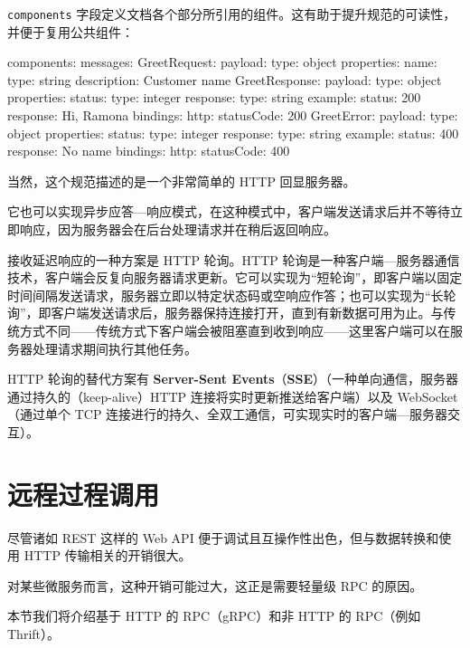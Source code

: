 \label{idx:1679}
\label{idx:1680}
\texttt{components} 字段定义文档各个部分所引用的组件。这有助于提升规范的可读性，并便于复用公共组件：

\begin{codebox}[yaml]
components:
  messages:
    GreetRequest:
      payload:
        type: object
        properties:
          name:
            type: string
            description: Customer name
    GreetResponse:
      payload:
        type: object
        properties:
          status:
            type: integer
          response:
            type: string
        example:
          status: 200
          response: Hi, Ramona
      bindings:
        http:
          statusCode: 200
    GreetError:
      payload:
        type: object
        properties:
          status:
            type: integer
          response:
            type: string
        example:
          status: 400
          response: No name
      bindings:
        http:
          statusCode: 400
\end{codebox}

当然，这个规范描述的是一个非常简单的 HTTP 回显服务器。

它也可以实现异步应答—响应模式，在这种模式中，客户端发送请求后并不等待立即响应，因为服务器会在后台处理请求并在稍后返回响应。

\label{idx:1681}
\label{idx:1682}
接收延迟响应的一种方案是 HTTP 轮询。HTTP 轮询是一种客户端—服务器通信技术，客户端会反复向服务器请求更新。它可以实现为“短轮询”，即客户端以固定时间间隔发送请求，服务器立即以特定状态码或空响应作答；也可以实现为“长轮询”，即客户端发送请求后，服务器保持连接打开，直到有新数据可用为止。与传统方式不同——传统方式下客户端会被阻塞直到收到响应——这里客户端可以在服务器处理请求期间执行其他任务。

\label{idx:1683}
HTTP 轮询的替代方案有 \textbf{Server-Sent Events}（\textbf{SSE}）（一种单向通信，服务器通过持久的（keep-alive）HTTP 连接将实时更新推送给客户端）以及 WebSocket（通过单个 TCP 连接进行的持久、全双工通信，可实现实时的客户端—服务器交互）。

\section{远程过程调用}

尽管诸如 REST 这样的 Web API 便于调试且互操作性出色，但与数据转换和使用 HTTP 传输相关的开销很大。

\label{idx:1684}
对某些微服务而言，这种开销可能过大，这正是需要轻量级 RPC 的原因。

本节我们将介绍基于 HTTP 的 RPC（gRPC）和非 HTTP 的 RPC（例如 Thrift）。

